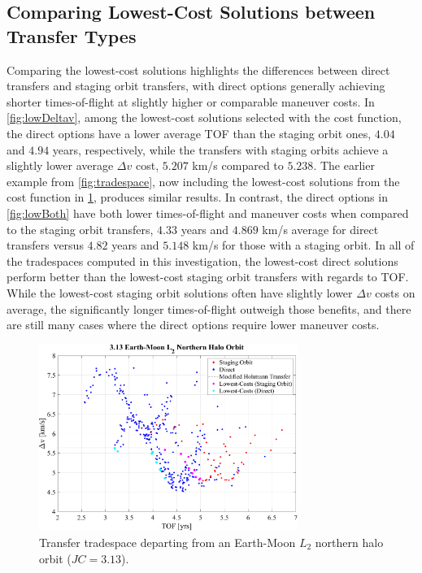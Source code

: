 \subsection{Comparing Lowest-Cost Solutions between Transfer Types}
Comparing the lowest-cost solutions highlights the differences between direct transfers and staging
orbit transfers, with direct options generally achieving shorter times-of-flight at slightly higher
or comparable maneuver costs. In \cref{fig:lowDeltav}, among the lowest-cost solutions selected
with the cost function, the direct options have a lower average TOF than the staging orbit ones,
$4.04$ and $4.94$ years, respectively, while the transfers with staging orbits achieve a slightly
lower average $\Delta v$ cost, $5.207$ km/s compared to $5.238$. The earlier example from
\cref{fig:tradespace}, now including the lowest-cost solutions from the cost function in
\cref{fig:costTradespace}, produces similar results. In contrast, the direct options in
\cref{fig:lowBoth} have both lower times-of-flight and maneuver costs when compared to the staging
orbit transfers, $4.33$ years and $4.869$ km/s average for direct transfers versus $4.82$ years and
$5.148$ km/s for those with a staging orbit. In all of the tradespaces computed in this
investigation, the lowest-cost direct solutions perform better than the lowest-cost staging orbit
transfers with regards to TOF. While the lowest-cost staging orbit solutions often have slightly
lower $\Delta v$ costs on average, the significantly longer times-of-flight outweigh those
benefits, and there are still many cases where the direct options require lower maneuver costs.

\begin{figure}[H]
    \centering
    \includegraphics[width=0.75\textwidth]{figures/TradeSpace_L2Halo_3_13.pdf}
    \caption{Transfer tradespace departing from an Earth-Moon $L_{2}$ northern halo orbit ($JC=3.13$).}
    \label{fig:costTradespace}
\end{figure}

